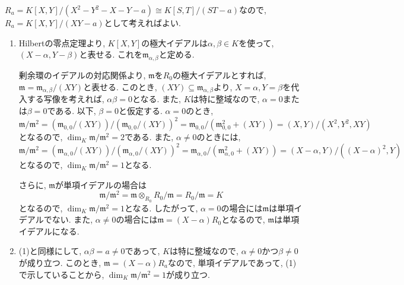 \documentclass[dvipdfmx]{jsarticle}
\begin{document}
    $R_a = K[X, Y]/ (X^2-Y^2-X-Y-a) \cong K[S,T]/(ST-a)$なので,
    $R_a = K[X, Y]/(XY-a)$として考えればよい.
    \begin{enumerate}
        \item Hilbertの零点定理より,
        $K[X, Y]$の極大イデアルは$\alpha, \beta \in K$を使って,
        $(X-\alpha, Y-\beta)$と表せる.
        これを$\mathfrak{m}_{\alpha, \beta}$と定める.

        剰余環のイデアルの対応関係より,
        $\mathfrak{m}$を$R_0$の極大イデアルとすれば,
        $\mathfrak{m} = \mathfrak{m}_{\alpha, \beta} /(XY)$と表せる.
        このとき, $(XY) \subseteq \mathfrak{m}_{\alpha, \beta}$より,
        $X = \alpha, Y = \beta$を代入する写像を考えれば,
        $\alpha\beta = 0$となる.
        また, $K$は特に整域なので,
        $\alpha = 0$または$\beta = 0$である.
        以下, $\beta = 0$と仮定する.
        $\alpha = 0$のとき,
        \[
            \mathfrak{m}/\mathfrak{m}^2 = (\mathfrak{m}_{0,0}/(XY)) /(\mathfrak{m}_{0,0}/(XY))^2 = \mathfrak{m}_{0,0}/(\mathfrak{m}_{0,0}^2 + (XY)) = (X,Y)/(X^2, Y^2, XY)
        \]
        となるので,
        $\dim_{K} \mathfrak{m}/\mathfrak{m}^2 = 2$である.
        また,
        $\alpha \neq 0$のときには,
        \[
            \mathfrak{m}/\mathfrak{m}^2 = (\mathfrak{m}_{\alpha,0}/(XY)) /(\mathfrak{m}_{\alpha,0}/(XY))^2 = \mathfrak{m}_{\alpha,0}/(\mathfrak{m}_{\alpha,0}^2 + (XY)) = (X-\alpha, Y)/((X-\alpha)^2, Y)
        \]
        となるので,
        $\dim_K \mathfrak{m}/\mathfrak{m}^2 = 1$となる.

        さらに, $\mathfrak{m}$が単項イデアルの場合は
        \[
            \mathfrak{m}/\mathfrak{m}^2 = \mathfrak{m} \otimes_{R_0} R_0/\mathfrak{m} = R_0/\mathfrak{m} = K
        \]
        となるので,
        $\dim_K \mathfrak{m}/\mathfrak{m}^2 = 1$となる.
        したがって,
        $\alpha = 0$の場合には$\mathfrak{m}$は単項イデアルでない.
        また, $\alpha \neq 0$の場合には$\mathfrak{m} = (X-\alpha)R_0$となるので, $\mathfrak{m}$は単項イデアルになる.
        \item (1)と同様にして, $\alpha\beta = a \neq 0$であって,
        $K$は特に整域なので, $\alpha \neq 0$かつ$\beta \neq 0$が成り立つ.
        このとき, $\mathfrak{m} = (X-\alpha)R_a$なので, 単項イデアルであって, 
        (1)で示していることから,
        $\dim_K \mathfrak{m}/\mathfrak{m}^2 = 1$が成り立つ.
    \end{enumerate}
\end{document}
